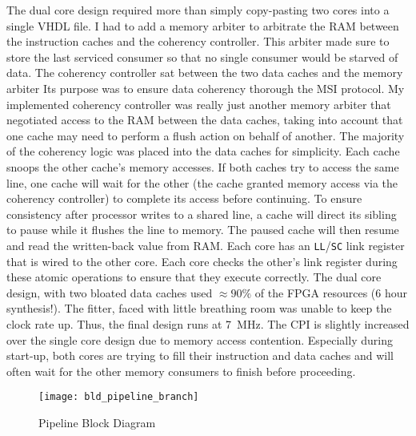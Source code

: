 \documentclass[12pt]{article}
\begin{document}
The dual core design required more than simply copy-pasting two cores into a single VHDL file. I had to add a memory arbiter to arbitrate the RAM between the instruction caches and the coherency controller. This arbiter made sure to store the last serviced consumer so that no single consumer would be starved of data. The coherency controller sat between the two data caches and the memory arbiter Its purpose was to ensure data coherency thorough the MSI protocol. My implemented coherency controller was really just another memory arbiter that negotiated access to the RAM between the data caches, taking into account that one cache may need to perform a flush action on behalf of another. The majority of the coherency logic was placed into the data caches for simplicity. Each cache snoops the other cache's memory accesses. If both caches try to access the same line, one cache will wait for the other (the cache granted memory access via the coherency controller) to complete its access before continuing. To ensure consistency after processor writes to a shared line, a cache will direct its sibling to pause while it flushes the line to memory. The paused cache will then resume and read the written-back value from RAM. Each core has an \texttt{LL}/\texttt{SC} link register that is wired to the other core. Each core checks the other's link register during these atomic operations to ensure that they execute correctly. The dual core design, with two bloated data caches used $\approx 90\%$ of the FPGA resources (6 hour synthesis!). The fitter, faced with little breathing room was unable to keep the clock rate up. Thus, the final design runs at 7~MHz. The CPI is slightly increased over the single core design due to memory access contention. Especially during start-up, both cores are trying to fill their instruction and data caches and will often wait for the other memory consumers to finish before proceeding.


\newpage

\begin{landscape}

\begin{figure}
	\begin{center}
		\texttt{[image: bld\_pipeline\_branch]}
	\end{center}
	\caption{Pipeline Block Diagram}
	\label{fig:pipeline}
\end{figure}

\end{landscape}

\newpage
\end{document}
